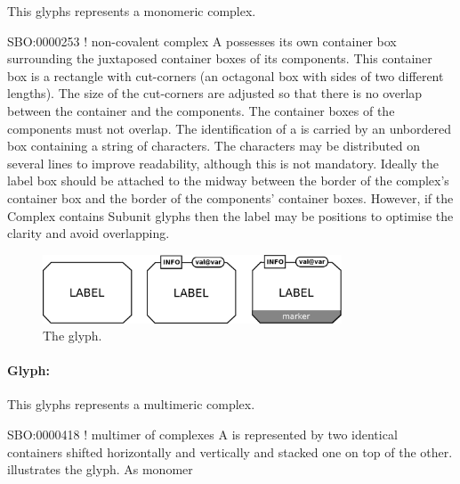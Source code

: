 This glyphs represents a monomeric complex.

\begin{glyphDescription}
\glyphSboTerm SBO:0000253 ! non-covalent complex
\glyphContainer A  possesses its own container box surrounding the juxtaposed container boxes of its components.  This container box is a rectangle with cut-corners (an octagonal box with sides of two different lengths).  The size of the cut-corners are adjusted so that there is no overlap between the container and the components.  The container boxes of the components must not overlap.
\glyphLabel The identification of a  is carried
by an unbordered box containing a string of characters.  The
characters may be distributed on several lines to improve readability,
although this is not mandatory.  Ideally the label box should be
attached to the midway between the border of the complex's container
box and the border of the components' container boxes. However, if the
Complex contains Subunit glyphs then the label may be positions to
optimise the clarity and avoid overlapping.
\end{glyphDescription}

\begin{figure}[htb]
  \centering
  \includegraphics[width=3.5in]{images/complexGlyph}
  \caption{The  glyph.}
  \label{fig:techref:complex}
\end{figure}

\paragraph{Glyph: }

This glyphs represents a multimeric complex.

\begin{glyphDescription}

\glyphSboTerm SBO:0000418 ! multimer of complexes
\glyphContainer A  is represented by two
identical  containers shifted horizontally and
vertically and stacked one on top of the other.  
illustrates the glyph.
\glyphLabel As monomer
\end{glyphDescription}

